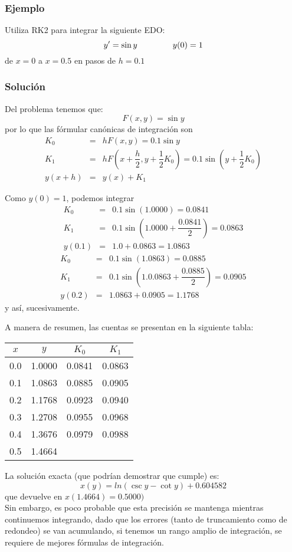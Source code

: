 \begin{frame}
\frametitle{Ejemplo}
Utiliza RK2 para integrar la siguiente EDO:
\[ y' = \sin y \hspace{1.5cm} y(0) = 1\]
de $x=0$ a $x=0.5$ en pasos de $h=0.1$
\end{frame}
\begin{frame}
\frametitle{Solución}
Del problema tenemos que:
\[ F(x,y) = \sin y\]
por lo que las fórmular canónicas de integración son
\begin{eqnarray*}
K_{0} &=& h F(x,y) = 0.1 \sin y \\
K_{1} &=& h F \left( x + \dfrac{h}{2}, y + \dfrac{1}{2} K_{0} \right) = 0.1 \sin \left(  y + \dfrac{1}{2} K_{0}\right) \\
y(x+h) &=& y(x) + K_{1}
\end{eqnarray*}
\end{frame}
\begin{frame}
Como $y(0) = 1$, podemos integrar
\begin{eqnarray*}
K_{0} &=& 0.1 \sin (1.0000) = 0.0841 \\
K_{1} &=& 0.1 \sin \left( 1.0000 + \dfrac{0.0841}{2} \right)  = 0.0863 \\
y(0.1) &=& 1.0 + 0.0863 = 1.0863
\end{eqnarray*}
\pause
\begin{eqnarray*}
K_{0} &=& 0.1 \sin (1.0863) = 0.0885 \\
K_{1} &=& 0.1 \sin \left( 1.0.0863 + \dfrac{0.0885}{2} \right)  = 0.0905 \\
y(0.2) &=& 1.0863 + 0.0905 = 1.1768
\end{eqnarray*}
y así, sucesivamente.
\end{frame}
\begin{frame}
A manera de resumen, las cuentas se presentan en la siguiente tabla:
\begin{center}
\begin{tabular}{c | c | c | c |}
$x$ & $y$ & $K_{0}$ & $K_{1}$ \\ 
\hline
\hline
0.0 & 1.0000 & 0.0841 & 0.0863 \\ \hline
0.1 & 1.0863 & 0.0885 & 0.0905 \\ \hline
0.2 & 1.1768 & 0.0923 & 0.0940 \\ \hline
0.3 & 1.2708 & 0.0955 & 0.0968 \\ \hline
0.4 & 1.3676 & 0.0979 & 0.0988 \\ \hline
0.5 & 1.4664 & & \\ \hline
\end{tabular}
\end{center}
\end{frame}
\begin{frame}
La solución exacta (que podrían demostrar que cumple) es:
\[ x(y) = ln(\csc y - \cot y) + 0.604582 \]
que devuelve en $x(1.4664) = 0.5000)$
\\
\bigskip
Sin embargo, es poco probable que esta precisión se mantenga mientras continuemos integrando, dado que los errores (tanto de truncamiento como de redondeo) se van acumulando, si tenemos un rango amplio de integración, se requiere de mejores fórmulas de integración.
\end{frame}
